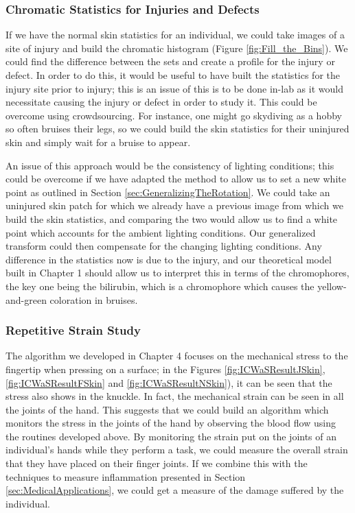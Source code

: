 \subsubsection{Chromatic Statistics for Injuries and Defects}\label{sec:ChromaticStatisticsForInjuriesAndDefects}
If we have the normal skin statistics for an individual, we could take images of a site of injury and build the chromatic histogram (Figure \ref{fig:Fill_the_Bins}). We could find the difference between the sets and create a profile for the injury or defect. In order to do this, it would be useful to have built the statistics for the injury site prior to injury; this is an issue of this is to be done in-lab as it would necessitate causing the injury or defect in order to study it. This could be overcome using crowdsourcing. For instance, one might go skydiving as a hobby so often bruises their legs, so we could build the skin statistics for their uninjured skin and simply wait for a bruise to appear. 

An issue of this approach would be the consistency of lighting conditions; this could be overcome if we have adapted the method to allow us to set a new white point as outlined in Section \ref{sec:GeneralizingTheRotation}. We could take an uninjured skin patch for which we already have a previous image from which we build the skin statistics, and comparing the two would allow us to find a white point which accounts for the ambient lighting conditions. Our generalized transform could then compensate for the changing lighting conditions. Any difference in the statistics now is due to the injury, and our theoretical model built in Chapter 1 should allow us to interpret this in terms of the chromophores, the key one being the bilirubin, which is a chromophore which causes the yellow-and-green coloration in bruises.

\subsubsection{Repetitive Strain Study}\label{sec:RepetitiveStrainStudy}
The algorithm we developed in Chapter 4 focuses on the mechanical stress to the fingertip when pressing on a surface; in the Figures \ref{fig:ICWaSResultJSkin}, \ref{fig:ICWaSResultFSkin} and \ref{fig:ICWaSResultNSkin}), it can be seen that the stress also shows in the knuckle. In fact, the mechanical strain can be seen in all the joints of the hand. This suggests that we could build an algorithm which monitors the stress in the joints of the hand by observing the blood flow using the routines developed above. By monitoring the strain put on the joints of an individual's hands while they perform a task, we could measure the overall strain that they have placed on their finger joints. If we combine this with the techniques to measure inflammation presented in Section \ref{sec:MedicalApplications}, we could get a measure of the damage suffered by the individual. 

